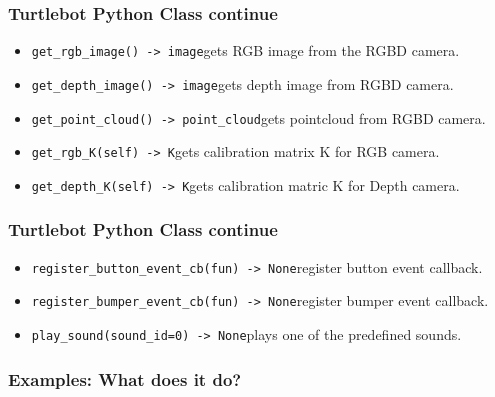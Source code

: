\documentclass{beamer}
\begin{document}
\begin{frame}[fragile]
  \frametitle{Turtlebot Python Class continue}
  \begin{itemize}
  \item \verb|get_rgb_image() -> image|\break gets RGB image from the RGBD camera.
  \item \verb|get_depth_image() -> image|\break gets depth image from RGBD camera.
  \item \verb|get_point_cloud() -> point_cloud|\break gets pointcloud from RGBD camera.
  \item \verb|get_rgb_K(self) -> K|\break gets calibration matrix K for RGB camera.
  \item \verb|get_depth_K(self) -> K|\break gets calibration matric K for Depth camera.
  \end{itemize}
\end{frame}

\begin{frame}[fragile]
  \frametitle{Turtlebot Python Class continue}
  \begin{itemize}
  \item \verb|register_button_event_cb(fun) -> None|\break register button event callback.
  \item \verb|register_bumper_event_cb(fun) -> None|\break register bumper event callback.
  \item \verb|play_sound(sound_id=0) -> None|\break plays one of the predefined sounds.
  \end{itemize}
\end{frame}

\begin{frame}[fragile]
  \frametitle{Examples: What does it do?}
  \inputminted[linenos, numbersep=5pt, frame=lines]{python}{../scripts/example_move_1m.py}
\end{frame}
\end{document}

